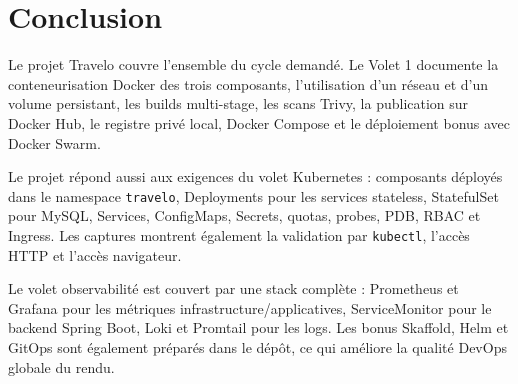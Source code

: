 \documentclass[11pt,a4paper]{article}
\begin{document}
\section{Conclusion}

Le projet Travelo couvre l'ensemble du cycle demandé. Le Volet 1 documente la conteneurisation Docker des trois composants, l'utilisation d'un réseau et d'un volume persistant, les builds multi-stage, les scans Trivy, la publication sur Docker Hub, le registre privé local, Docker Compose et le déploiement bonus avec Docker Swarm.

Le projet répond aussi aux exigences du volet Kubernetes : composants déployés dans le namespace \texttt{travelo}, Deployments pour les services stateless, StatefulSet pour MySQL, Services, ConfigMaps, Secrets, quotas, probes, PDB, RBAC et Ingress. Les captures montrent également la validation par \texttt{kubectl}, l'accès HTTP et l'accès navigateur.

Le volet observabilité est couvert par une stack complète : Prometheus et Grafana pour les métriques infrastructure/applicatives, ServiceMonitor pour le backend Spring Boot, Loki et Promtail pour les logs. Les bonus Skaffold, Helm et GitOps sont également préparés dans le dépôt, ce qui améliore la qualité DevOps globale du rendu.
\end{document}
